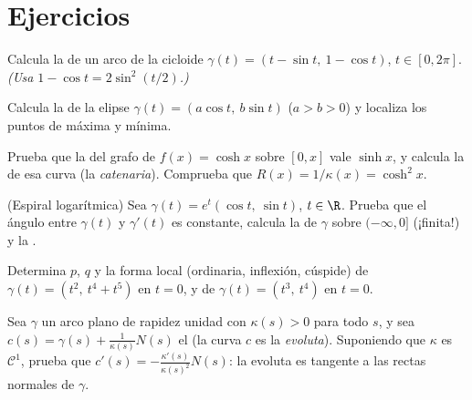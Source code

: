 \section{Ejercicios}

\begin{exercise}[$\star$]\label{exo:b2:curves:1}
Calcula la  de un arco de la cicloide $\gamma(t) = (t -
\sin t,\ 1 - \cos t)$, $t \in [0, 2\pi]$. \emph{(Usa $1 - \cos t =
2\sin^2(t/2)$.)}
\end{exercise}

\begin{exercise}[$\star$]\label{exo:b2:curves:2}
Calcula la  de la elipse $\gamma(t) = (a\cos t,\ b\sin t)$
($a > b > 0$) y localiza los puntos de  máxima y mínima.
\end{exercise}

\begin{exercise}[$\star$]\label{exo:b2:curves:3}
Prueba que la  del grafo de $f(x) = \cosh x$ sobre
$[0, x]$ vale $\sinh x$, y calcula la  de esa curva (la
\emph{catenaria}). Comprueba que $R(x) = 1/\kappa(x) = \cosh^2 x$.
\end{exercise}

\begin{exercise}[$\star\star$]\label{exo:b2:curves:4}
(Espiral logarítmica) Sea $\gamma(t) = e^{t}(\cos t,\ \sin t)$, $t
\in \R$. Prueba que el ángulo entre $\gamma(t)$ y $\gamma'(t)$ es
constante, calcula la  de $\gamma$ sobre $(-\infty,
0]$ (¡finita!) y la .
\end{exercise}

\begin{exercise}[$\star\star$]\label{exo:b2:curves:5}
Determina $p$, $q$ y la forma local (ordinaria, inflexión, cúspide)
de $\gamma(t) = (t^2,\ t^4 + t^5)$ en $t = 0$, y de $\gamma(t) =
(t^3,\ t^4)$ en $t = 0$.
\end{exercise}

\begin{exercise}[$\star\star$]\label{exo:b2:curves:6}
Sea $\gamma$ un arco plano de rapidez unidad con $\kappa(s) > 0$ para
todo $s$, y sea $c(s) = \gamma(s) + \frac{1}{\kappa(s)}N(s)$ el
 (la curva $c$ es la \emph{evoluta}). Suponiendo
que $\kappa$ es $\mathcal{C}^1$, prueba que $c'(s) =
-\frac{\kappa'(s)}{\kappa(s)^2}N(s)$: la evoluta es tangente a las
rectas normales de $\gamma$.
\end{exercise}

